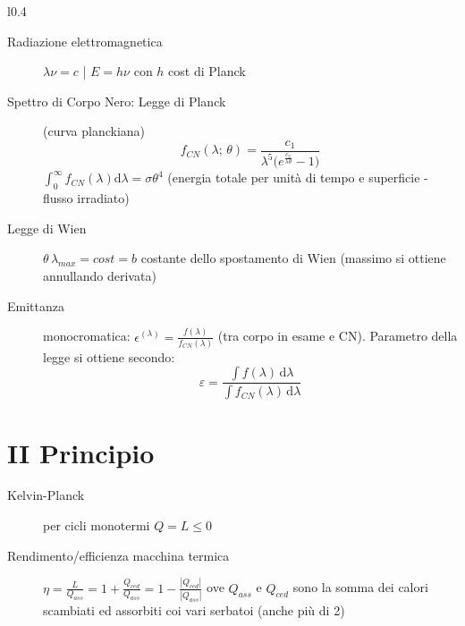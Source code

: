 \documentclass[10pt, oneside]{article}
\begin{document}
\begin{wrapfigure}{l}{0.4\textwidth}
\centering
{}
\vspace{-3cm}
\end{wrapfigure}
\noindent 
\begin{description}
\item[Radiazione elettromagnetica] $\displaystyle \lambda \nu = c$ \bigg| $\displaystyle E = h \nu$ con $h$ cost di Planck
\item[Spettro di Corpo Nero: Legge di Planck] (curva planckiana)
\[\boxed{f_{CN}(\lambda; \, \theta) = \frac{c_1}{\lambda^5 \big(\displaystyle e^{\frac{c_2}{\lambda \theta}} - 1 \big)}}\]
$\displaystyle \int_{0}^{\infty}f_{CN}(\lambda) \mathrm{d}\lambda = \sigma \theta^4$ (energia totale per unità di tempo e superficie - flusso irradiato)
\\
\end{description}

\begin{description}
\item[Legge di Wien] $\displaystyle \theta \, \lambda_{max} = cost = b$ costante dello spostamento di Wien (massimo si ottiene annullando derivata)
\item[Emittanza] monocromatica: $\displaystyle \epsilon^{(\lambda)} = \frac{f(\lambda)}{f_{CN}(\lambda)}$ (tra corpo in esame e CN). Parametro della legge si ottiene secondo:
\[\varepsilon = \frac{\int f(\lambda)\, \mathrm{d}\lambda}{\int f_{CN}(\lambda)\, \mathrm{d}\lambda}\]

\end{description}

\section{II Principio}
\begin{description}
\item[Kelvin-Planck] per cicli monotermi $\displaystyle Q = L \leq 0$
\item[Rendimento/efficienza macchina termica] $\displaystyle \eta = \frac{L}{Q_{ass}} = 1 + \frac{Q_{ced}}{Q_{ass}} = 1 - \frac{|Q_{ced}|}{|Q_{ass}|}$ ove $Q_{ass}$ e $Q_{ced}$ sono la somma dei calori scambiati ed assorbiti coi vari serbatoi (anche più di 2)
\end{description}
\end{document}
